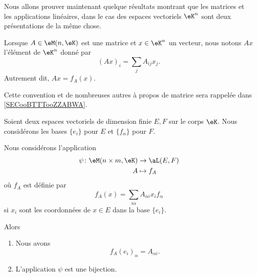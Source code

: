 Nous allons prouver maintenant quelque résultats montrant que les matrices et les applications linéaires, dans le cas des espaces vectoriels \( \eK^n\) sont deux présentations de la même chose.

\begin{normaltext}
    Lorsque \( A\in \eM(n,\eK)\) est une matrice et \( x\in \eK^n\) un vecteur, nous notons \( Ax\) l'élément de \( \eK^n\) donné par
    \begin{equation}        \label{EQooQFVTooMFfzol}
        (Ax)_i=\sum_jA_{ij}x_j.
    \end{equation}
    Autrement dit, \( Ax=f_A(x)\).

    Cette convention et de nombreuses autres à propos de matrice sera rappelée dans \ref{SECooBTTTooZZABWA}.
\end{normaltext}

\begin{proposition}      \label{PROPooGXDBooHfKRrv}
    Soient deux espaces vectoriels de dimension finie \( E,F\) sur le corps \( \eK\). Nous considérons les bases \( \{ e_i \}\) pour \( E\) et \( \{ f_{\alpha} \}\) pour \( F\). 

    Nous considérons l'application
    \begin{equation}
        \begin{aligned}
            \psi\colon \eM(n\times m, \eK)&\to \aL(E,F) \\
            A&\mapsto f_A 
        \end{aligned}
    \end{equation}
    où \( f_A\) est définie par
    \begin{equation}
        f_A(x)=\sum_{i\alpha}A_{\alpha i}x_if_{\alpha}
    \end{equation}
    si \( x_i\) sont les coordonnées de \( x\in E\) dans la base \( \{ e_i \}\).

    Alors
    \begin{enumerate}
        \item       \label{ITEMooKZYYooZPTkpq}
            Nous avons
            \begin{equation}
                f_A(e_i)_{\alpha}=A_{\alpha i}.
            \end{equation}
        \item       \label{ITEMooHSMLooRJZref}
            L'application \( \psi\) est une bijection.
    \end{enumerate}
\end{proposition}

